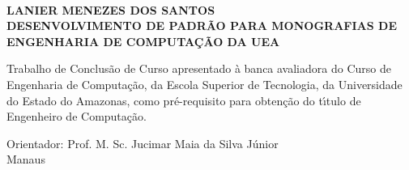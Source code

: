 \thispagestyle{empty}

\begin{center}
	\textbf{\\[4em]LANIER MENEZES DOS SANTOS \\[5cm]}
	\textbf{DESENVOLVIMENTO DE PADR\~{A}O PARA MONOGRAFIAS DE ENGENHARIA DE COMPUTA\c{C}\~{A}O DA UEA\\[96pt]}
\end{center}
\hspace*{8cm}
\begin{minipage}{8cm} 
	Trabalho de Conclus\~{a}o de Curso apresentado \`{a} banca avaliadora do Curso de Engenharia de Computa\c{c}\~{a}o, da 
	Escola Superior de Tecnologia, da Universidade do Estado do Amazonas, como
	pr\'e-requisito para obten\c{c}\~{a}o do t\'{\i}tulo de Engenheiro de Computa\c{c}\~{a}o.\\[50pt] 
\end{minipage} 
\begin{center}
	Orientador: Prof. M. Sc. Jucimar Maia da Silva J\'{u}nior\\[4ex]
	\normal Manaus\\
\end{center}


